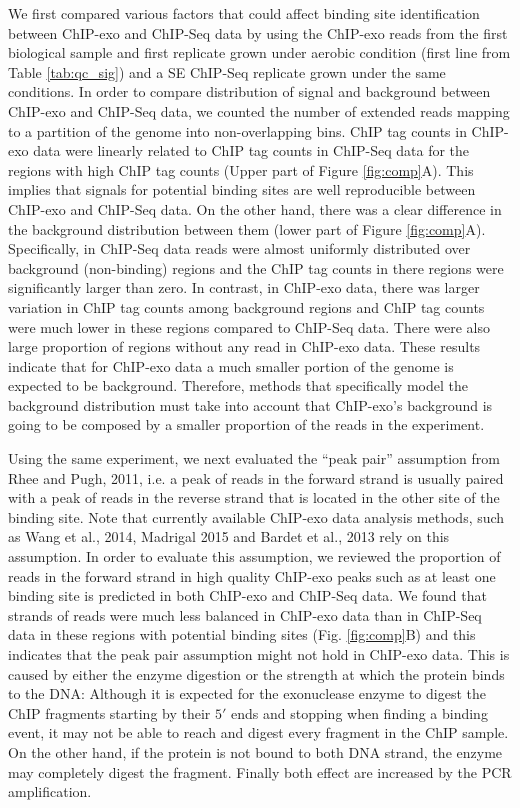 \documentclass{bmcart}
\begin{document}
We first compared various factors that could affect binding site
identification between ChIP-exo and ChIP-Seq data by using the
ChIP-exo reads from the first biological sample and first replicate
grown under aerobic condition (first line from Table \ref{tab:qc_sig})
and a SE ChIP-Seq replicate grown under the same conditions. In order
to compare distribution of signal and background between ChIP-exo and
ChIP-Seq data, we counted the number of extended reads mapping to a
partition of the genome into non-overlapping bins. ChIP tag counts in
ChIP-exo data were linearly related to ChIP tag counts in ChIP-Seq
data for the regions with high ChIP tag counts (Upper part of Figure
\ref{fig:comp}A). This implies that signals for potential binding
sites are well reproducible between ChIP-exo and ChIP-Seq data. On the
other hand, there was a clear difference in the background
distribution between them (lower part of Figure
\ref{fig:comp}A). Specifically, in ChIP-Seq data reads were almost
uniformly distributed over background (non-binding) regions and the
ChIP tag counts in there regions were significantly larger than
zero. In contrast, in ChIP-exo data, there was larger variation in
ChIP tag counts among background regions and ChIP tag counts were much
lower in these regions compared to ChIP-Seq data. There were also
large proportion of regions without any read in ChIP-exo data. These
results indicate that for ChIP-exo data a much smaller portion of the
genome is expected to be background. Therefore, methods that
specifically model the background distribution must take into account
that ChIP-exo's background is going to be composed by a smaller
proportion of the reads in the experiment.

Using the same experiment, we next evaluated the ``peak pair''
assumption from Rhee and Pugh, 2011\nocite{exo1}, i.e. a peak of reads
in the forward strand is usually paired with a peak of reads in the
reverse strand that is located in the other site of the binding
site. Note that currently available ChIP-exo data analysis methods,
such as Wang et al., 2014\nocite{mace}, Madrigal 2015\nocite{cexor}
and Bardet et al., 2013\nocite{peakzilla} rely on this assumption. In
order to evaluate this assumption, we reviewed the proportion of reads
in the forward strand in high quality ChIP-exo peaks such as at least
one binding site is predicted in both ChIP-exo and ChIP-Seq data. We
found that strands of reads were much less balanced in ChIP-exo data
than in ChIP-Seq data in these regions with potential binding sites
(Fig. \ref{fig:comp}B) and this indicates that the peak pair
assumption might not hold in ChIP-exo data. This is caused by either
the enzyme digestion or the strength at which the protein binds to the
DNA: Although it is expected for the exonuclease enzyme to digest the
ChIP fragments starting by their $5\prime$ ends and stopping when
finding a binding event, it may not be able to reach and digest every
fragment in the ChIP sample. On the other hand, if the protein is not
bound to both DNA strand, the enzyme may completely digest the
fragment. Finally both effect are increased by the PCR amplification.
\end{document}
